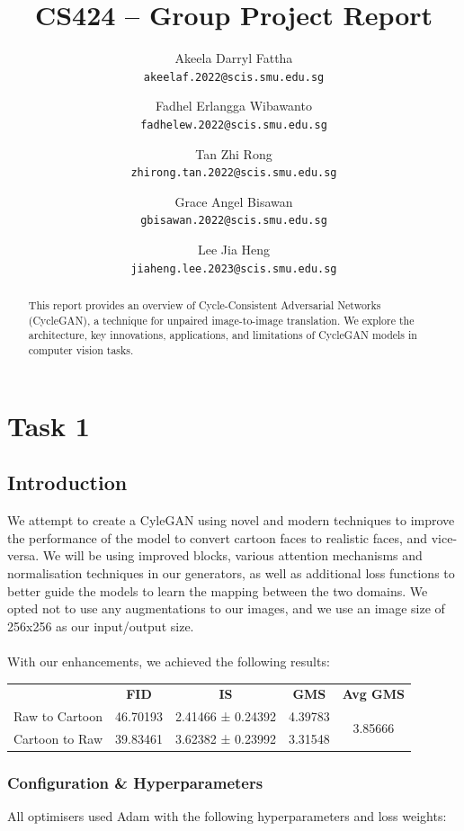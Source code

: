 \documentclass[twoside,english,notitlepage]{report}
\title{CS424 – Group Project Report}
\author{
    Akeela Darryl Fattha\\
    \texttt{akeelaf.2022@scis.smu.edu.sg}
    \and
    Fadhel Erlangga Wibawanto\\
    \texttt{fadhelew.2022@scis.smu.edu.sg}
    \and
    Tan Zhi Rong\\
    \texttt{zhirong.tan.2022@scis.smu.edu.sg}
    \and
    Grace Angel Bisawan \\
    \texttt{gbisawan.2022@scis.smu.edu.sg}
    \and
    Lee Jia Heng\\
    \texttt{jiaheng.lee.2023@scis.smu.edu.sg}
}
\begin{document}
\date{}
\maketitle
\begin{abstract}
This report provides an overview of Cycle-Consistent Adversarial Networks (CycleGAN), a technique for unpaired image-to-image translation. We explore the architecture, key innovations, applications, and limitations of CycleGAN models in computer vision tasks.
\end{abstract}
\tableofcontents


\chapter{Task 1}

\section{Introduction}
We attempt to create a CyleGAN using novel and modern techniques to improve the performance of the model to convert cartoon faces to realistic faces, and vice-versa. We will be using improved blocks, various attention mechanisms and normalisation techniques in our generators, as well as additional loss functions to better guide the models to learn the mapping between the two domains. We opted not to use any augmentations to our images, and we use an image size of 256x256 as our input/output size. \\\\
With our enhancements, we achieved the following results:

\begin{table}[h]
    \centering
    \begin{tabular}{|l|c|c|c|c|}
    \hline
    \textbf{} & \textbf{FID} & \textbf{IS} & \textbf{GMS} & \textbf{Avg GMS} \\
    \cline{1-5}
    Raw to Cartoon     & 46.70193     & 2.41466 ± 0.24392   & 4.39783    & \multirow{2}{*}{3.85666} \\
    Cartoon to Raw     & 39.83461         & 3.62382 ± 0.23992        & 3.31548        &            \\
    \hline
    \end{tabular}
\end{table}

\subsection{Configuration \& Hyperparameters}
All optimisers used Adam with the following hyperparameters and loss weights:
\end{document}
